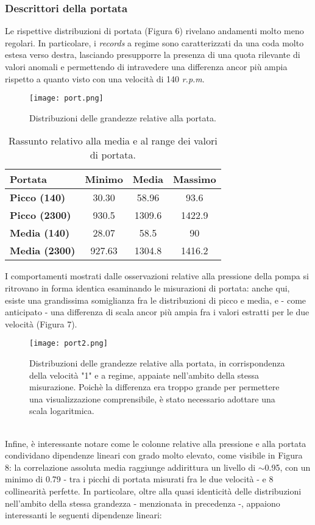 \documentclass[fleqn,10pt]{SelfArx} %
\begin{document}
\subsubsection{Descrittori della portata}
Le rispettive distribuzioni di portata (Figura 6) rivelano andamenti molto meno regolari. In particolare, i \textit{records} a regime sono caratterizzati da una coda molto estesa verso destra, lasciando presupporre la presenza di una  quota rilevante di valori anomali e permettendo di intravedere una differenza ancor più ampia rispetto a quanto visto con una velocità di 140 \textit{r.p.m}.  
\begin{figure}[h]
    \centering
    \texttt{[image: port.png]}
    \label{fig:em}
    \caption{Distribuzioni delle grandezze relative alla portata.}
\end{figure}
{\begin{table}[h]
\centering
\begin{tabular}[t]{lccc}
\toprule
Portata&Minimo&Media&Massimo\\
\midrule
\textbf{Picco (140)}&30.30&58.96&93.6\\
\textbf{Picco (2300)}&930.5&1309.6&1422.9\\
\textbf{Media (140)}&28.07&58.5&90\\
\textbf{Media (2300)}&927.63&1304.8&1416.2\\
\bottomrule
\end{tabular}
\caption{Rassunto relativo alla media e al range dei valori di portata.}
\end{table}}
I comportamenti mostrati dalle osservazioni relative alla pressione della pompa si ritrovano in forma identica esaminando le misurazioni di portata: anche qui, esiste una grandissima somiglianza fra le distribuzioni di picco e media, e - come anticipato - una differenza di scala ancor più ampia fra i valori estratti per le due velocità (Figura 7).
\begin{figure}[h]
    \centering
    \texttt{[image: port2.png]}
    \label{fig:em}
    \caption{Distribuzioni delle grandezze relative alla portata, in corrispondenza della velocità "1" e a regime, appaiate nell'ambito della stessa misurazione. Poichè la differenza era troppo grande per permettere una visualizzazione comprensibile, è stato necessario adottare una scala logaritmica.}
\end{figure}
\\
Infine, è interessante notare come le colonne relative alla pressione e alla portata condividano dipendenze lineari con grado molto elevato, come visibile in Figura 8: la correlazione assoluta media raggiunge addirittura un livello di $\sim$0.95, con un minimo di 0.79 - tra i picchi di portata misurati fra le due velocità - e 8 collinearità perfette. In particolare, oltre alla quasi identicità delle distribuzioni nell'ambito della stessa grandezza - menzionata in precedenza -, appaiono interessanti le seguenti dipendenze lineari:
\end{document}
